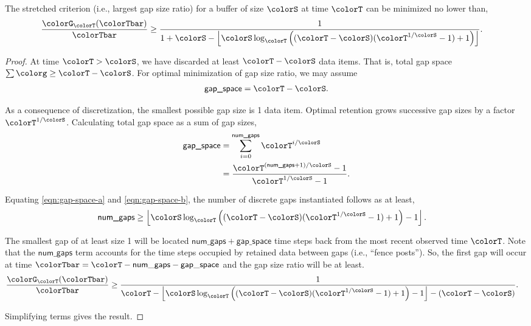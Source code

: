 \begin{lemma}
\label{thm:stretched-ideal-strict}
The stretched criterion (i.e., largest gap size ratio) for a buffer of size $\colorS$ at time $\colorT$ can be minimized no lower than,
\begin{align*}
\frac{\colorG_{\colorT}(\colorTbar)}{\colorTbar}
&\geq
\frac{
  1
}{
  1 + \colorS
  - \left\lfloor \colorS \log_{\colorT}\Big(
    (\colorT - \colorS)(\colorT^{1/\colorS} - 1) + 1
  \Big)\right\rfloor
}.
\end{align*}
\end{lemma}

\begin{proof}
At time $\colorT > \colorS$, we have discarded at least $\colorT - \colorS$ data items.
That is, total gap space $\sum \colorg \geq \colorT - \colorS$.
For optimal minimization of gap size ratio, we may assume
\begin{align}
\textsf{gap\_space} = \colorT - \colorS.
\label{eqn:gap-space-a}
\end{align}

As a consequence of discretization, the smallest possible gap size is 1 data item.
Optimal retention grows successive gap sizes by a factor $\colorT^{1/\colorS}$.
Calculating total gap space as a sum of gap sizes,
\begin{align}
\textsf{gap\_space}
&=
\sum_{i = 0}^{\textsf{num\_gaps}} \colorT^{i/\colorS} %
\nonumber \\
&=
\frac{
  \colorT^{(\textsf{num\_gaps} + 1)/\colorS} - 1
}{
  \colorT^{1/\colorS} - 1
}.
\label{eqn:gap-space-b}
\end{align}

Equating \ref{eqn:gap-space-a} and \ref{eqn:gap-space-b}, the number of discrete gaps instantiated follows as at least,
\begin{align*}
\textsf{num\_gaps}
&\geq
\left\lfloor
\colorS \log_{\colorT}\Big(
  (\colorT - \colorS)(\colorT^{1/\colorS} - 1) + 1
\Big) - 1
\right\rfloor.
\end{align*}

The smallest gap of at least size 1 will be located $\mathsf{num\_gaps} + \mathsf{gap\_space}$ time steps back from the most recent observed time $\colorT$.
Note that the $\mathsf{num\_gaps}$ term accounts for the time steps occupied by retained data between gaps (i.e., ``fence posts'').
So, the first gap will occur at time $\colorTbar = \colorT - \mathsf{num\_gaps} - \mathsf{gap\_space}$ and the gap size ratio will be at least.
\begin{align*}
\frac{\colorG_{\colorT}(\colorTbar)}{\colorTbar}
&\geq
\frac{1}{
\colorT
- \left\lfloor
\colorS \log_{\colorT}\Big(
  (\colorT - \colorS)(\colorT^{1/\colorS} - 1) + 1
\Big) - 1
\right\rfloor - (\colorT - \colorS)
}.
\end{align*}

Simplifying terms gives the result.
\end{proof}
